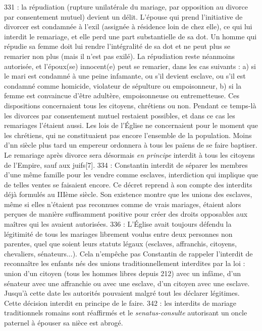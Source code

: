  331 : la répudiation (rupture unilatérale du mariage, par opposition au divorce par consentement mutuel) devient un délit. L'épouse qui prend l'initiative de divorcer est condamnée à l'exil (assignée à résidence loin de chez elle), ce qui lui interdit le remariage, et elle perd une part substantielle de sa dot. Un homme qui répudie sa femme doit lui rendre l'intégralité de sa dot et ne peut plus se remarier non plus (mais il n'est pas exilé). La répudiation reste néanmoins autorisée, et l'époux(se) innocent(e) peut se remarier, dans les cas suivants : a) si le mari est condamné à une peine infamante, ou s'il devient esclave, ou s'il est condamné comme homicide, violateur de sépulture ou empoisonneur, b) si la femme est convaincue d'être adultère, empoisonneuse ou entremetteuse. Ces dispositions concernaient tous les citoyens, chrétiens ou non. Pendant ce temps-là les divorces par consentement mutuel restaient possibles, et dans ce cas les remariages l'étaient aussi. Les lois de l'Église ne concernaient pour le moment que les chrétiens, qui ne constituaient pas encore l'ensemble de la population. Moins d'nn siècle plus tard un empereur ordonnera à tous les païens de se faire baptiser. Le remariage après divorce sera désormais \emph{en principe} interdit à tous les citoyens de l'Empire, sauf aux juifs[7]. 
 334 : Constantin interdit de séparer les membres d'une même famille pour les vendre comme esclaves, interdiction qui implique que de telles ventes se faisaient encore. Ce décret reprend à son compte des interdits déjà formulés au IIIème siècle. Son existence montre que les unions des esclaves, même si elles n'étaient pas reconnues comme de vrais mariages, étaient alors perçues de manière suffisamment positive pour créer des droits opposables aux maîtres qui les avaient autorisées. 
 336 : L'Église avait toujours défendu la légitimité de tous les mariages librement voulus entre deux personnes non parentes, quel que soient leurs statuts légaux (esclaves, affranchis, citoyens, chevaliers, sénateurs...). Cela n'empêche pas Constantin de rappeler l'interdit de reconnaître les enfants nés des unions traditionnellement interdites par la loi : union d'un citoyen (tous les hommes libres depuis 212) avec un infâme, d'un sénateur avec une affranchie ou avec une esclave, d'un citoyen avec une esclave. Jusqu'à cette date les autorités pouvaient malgré tout les déclarer légitimes. Cette décision interdit en principe de le faire. 
 342 : les interdits de mariage traditionnels romains sont réaffirmés et le \emph{senatus-consulte} autorisant un oncle paternel à épouser sa nièce est abrogé.
